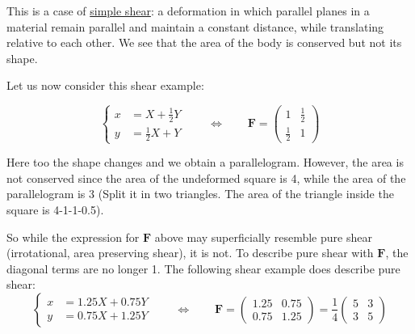 This is a case of \underline{simple shear}: a deformation in which parallel planes in a material remain 
parallel and maintain a constant distance, while translating relative to each other. 
We see that the area of the body is conserved but not its shape.


Let us now consider this shear example:

\begin{equation}
\begin{cases} 
x &=X + \frac12 Y \\ 
y &=\frac12 X + Y 
\end{cases}
\qquad
\Leftrightarrow
\qquad
{\bm F} = 
\left(
\begin{array}{cc}
1 & \frac12 \\
\frac12 & 1
\end{array}
\right)
\label{eq:shearing1}
\end{equation}

\begin{center}
\end{center}

Here too the shape changes and we obtain a parallelogram. However, 
the area is not conserved since the area of the undeformed square is 4, 
while the area of the parallelogram is 3
(Split it in two triangles. The area of the triangle inside the square is 4-1-1-0.5).

So while the expression for ${\bm F}$ above may superficially resemble 
pure shear (irrotational, area preserving shear), it is not. 
To describe pure shear with ${\bm F}$, the diagonal terms are no longer 1. 
The following shear example does describe pure shear:
\begin{equation}
\begin{cases} 
x &=1.25X + 0.75 Y \\ 
y &=0.75 X + 1.25Y 
\end{cases}
\qquad
\Leftrightarrow
\qquad
{\bm F} = 
\left(
\begin{array}{cc}
1.25 & 0.75 \\
0.75 & 1.25
\end{array}
\right)
=\frac14
\left(
\begin{array}{cc}
5 & 3 \\
3 & 5
\end{array}
\right)
\label{eq:shearing3}
\end{equation}

